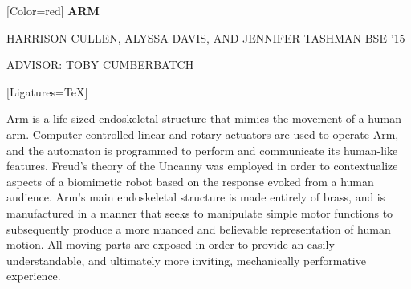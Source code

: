 \documentclass{article}
\begin{document}
{
	[Color=red]
	\fontsize{0.8in}{0.4in}\selectfont 
	\bfseries
	ARM
}

\vspace{0.25in}

{
	\fontsize{0.489in}{0.6in}\selectfont
	HARRISON CULLEN, ALYSSA DAVIS, {\fontsize{0.4in}{0.6in}\selectfont AND}
	 JENNIFER TASHMAN {\fontsize{0.4in}{0.6in}\selectfont BSE '15}
}

\vspace{0.1in}

{
	\fontsize{0.4in}{0.4in}\selectfont
	ADVISOR: TOBY CUMBERBATCH
}

\vspace{0.2in}

{
	[Ligatures=TeX]
	\fontsize{0.4in}{0.46in}\selectfont

    Arm is a life-sized endoskeletal structure that mimics the movement of a
	human arm. Computer-controlled linear and rotary actuators are used to operate
	Arm, and the automaton is programmed to perform and communicate its human-like
	features. Freud’s theory of the Uncanny was employed in order to contextualize
	aspects of a biomimetic robot based on the response evoked from a human
	audience. Arm’s main endoskeletal structure is made entirely of brass, and is
	manufactured in a manner that seeks to manipulate simple motor functions to
	subsequently produce a more nuanced and believable representation of human
	motion. All moving parts are exposed in order to provide an easily
	understandable, and ultimately more inviting, mechanically performative
	experience.

}
\end{document}
